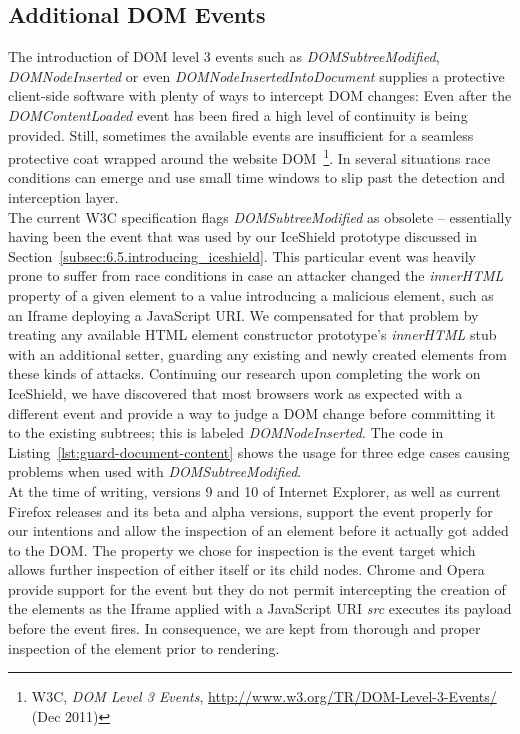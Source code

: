     \subsection{Additional DOM Events}
    \label{subsubsec:6.7.1.additional_dom_events}

    The introduction of DOM level 3 events such as \textit{DOMSubtreeModified}, \textit{DOMNodeInserted} or even \textit{DOMNodeInsertedIntoDocument} supplies a protective client-side software with plenty of ways to intercept DOM changes: Even after the \textit{DOMContentLoaded} event has been fired a high level of continuity is being provided. Still, sometimes the available events are insufficient for a seamless protective coat wrapped around the website DOM~\footnote{W3C, \textit{DOM Level 3 Events}, \url{http://www.w3.org/TR/DOM-Level-3-Events/} (Dec 2011)}. In several situations race conditions can emerge and use small time windows to slip past the detection and interception layer.\\

    The current W3C specification flags \textit{DOMSubtreeModified} as obsolete -- essentially having been the event that was used by our IceShield prototype discussed in Section~\ref{subsec:6.5.introducing_iceshield}. This particular event was heavily prone to suffer from race conditions in case an attacker changed the \textit{innerHTML} property of a given element to a value introducing a malicious element, such as an Iframe deploying a JavaScript URI. We compensated for that problem by treating any available HTML element constructor prototype's \textit{innerHTML} stub with an additional setter, guarding any existing and newly created elements from these kinds of attacks. Continuing our research upon completing the work on IceShield, we have discovered that most browsers work as expected with a different event and provide a way to judge a DOM change before committing it to the existing subtrees; this is labeled \textit{DOMNodeInserted}. The code in Listing~\ref{lst:guard-document-content} shows the usage for three edge cases causing problems when used with \textit{DOMSubtreeModified}.\\

    At the time of writing, versions 9 and 10 of Internet Explorer, as well as current Firefox releases and its beta and alpha versions, support the event properly for our intentions and allow the inspection of an element before it actually got added to the DOM. The property we chose for inspection is the event target which allows further inspection of either itself or its child nodes. Chrome and Opera provide support for the event but they do not permit intercepting the creation of the elements as the Iframe applied with a JavaScript URI \textit{src} executes its payload before the event fires. In consequence, we are kept from thorough and proper inspection of the element prior to rendering.

